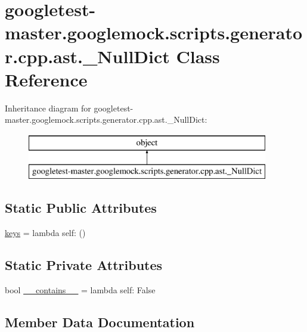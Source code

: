 \hypertarget{classgoogletest-master_1_1googlemock_1_1scripts_1_1generator_1_1cpp_1_1ast_1_1___null_dict}{}\section{googletest-\/master.googlemock.\+scripts.\+generator.\+cpp.\+ast.\+\_\+\+Null\+Dict Class Reference}
\label{classgoogletest-master_1_1googlemock_1_1scripts_1_1generator_1_1cpp_1_1ast_1_1___null_dict}
Inheritance diagram for googletest-\/master.googlemock.\+scripts.\+generator.\+cpp.\+ast.\+\_\+\+Null\+Dict\+:\begin{figure}[H]
\begin{center}
\leavevmode
\includegraphics[height=2.000000cm]{dc/d8d/classgoogletest-master_1_1googlemock_1_1scripts_1_1generator_1_1cpp_1_1ast_1_1___null_dict}
\end{center}
\end{figure}
\subsection*{Static Public Attributes}
\begin{DoxyCompactItemize}
\item 
\mbox{\hyperlink{classgoogletest-master_1_1googlemock_1_1scripts_1_1generator_1_1cpp_1_1ast_1_1___null_dict_ab703b9ea31408cdaf0b66df173d16f1e}{keys}} = lambda self\+: ()
\end{DoxyCompactItemize}
\subsection*{Static Private Attributes}
\begin{DoxyCompactItemize}
\item 
bool \mbox{\hyperlink{classgoogletest-master_1_1googlemock_1_1scripts_1_1generator_1_1cpp_1_1ast_1_1___null_dict_a0273d6200eef451584dc3d2468debcaa}{\+\_\+\+\_\+contains\+\_\+\+\_\+}} = lambda self\+: False
\end{DoxyCompactItemize}


\subsection{Member Data Documentation}
\mbox{\label{classgoogletest-master_1_1googlemock_1_1scripts_1_1generator_1_1cpp_1_1ast_1_1___null_dict_a0273d6200eef451584dc3d2468debcaa}} 
